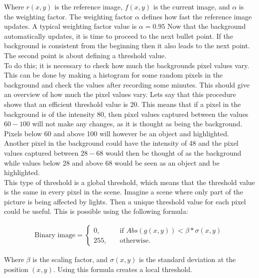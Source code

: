Where $r(x,y)$ is the reference image, $f(x,y)$ is the current image, and $\alpha$ is the weighting factor. The weighting factor $\alpha$ defines how fast the reference image updates. A typical weighting factor value is  $\alpha = 0.95$
Now that the background automatically updates, it is time to proceed to the next bullet point.
If the background is consistent from the beginning then it also leads to the next point. 
The second point is about defining a threshold value. \\
To do this; it is necessary to check how much the backgrounds pixel values vary. This can be done by making a histogram for some random pixels in the background and check the values after recording some minutes. This should give an overview of how much the pixel values vary. Lets say that this procedure shows that an efficient threshold value is 20. This means that if a pixel in the background is of the intensity 80, then pixel values captured between the values $60-100$ will not make any changes, as it is thought as being the background. Pixels below 60 and above 100 will however be an object and highlighted.
Another pixel in the background could have the intensity of 48 and the pixel values captured between $28-68$ would then be thought of as the background while values below 28 and above 68 would be seen as an object and be highlighted. \\
This type of threshold is a global threshold, which means that the threshold value is the same in every pixel in the scene. Imagine a scene where only part of the picture is being affected by lights. Then a unique threshold value for each pixel could be useful. This is possible using the following formula:

\begin{equation}
	\begin{aligned}
  		\ \text{Binary image} = \left\{ \begin{array}{ll}
         0, \quad &\text{if } Abs(g(x,y))<\beta * \sigma(x,y)\\
        255, \quad &\text{otherwise}.
        \end{array} \right . \ 
 	\end{aligned}
\end{equation} 

Where $\beta$ is the scaling factor, and $\sigma(x,y)$ is the standard deviation at the position $(x,y)$. Using this formula creates a local threshold.

